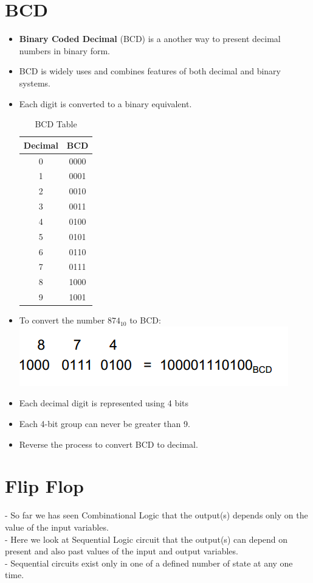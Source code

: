 \documentclass[12pt]{article}
\begin{document}
\section{BCD}
\begin{itemize}
	\item \textbf{Binary Coded Decimal} (BCD) is a another way to present decimal numbers in binary form.
 	\item BCD is widely uses and combines features of both decimal and binary systems.
 	\item Each digit is converted to a binary equivalent.
\begin{table}[h!]
\begin{center}
	\caption{BCD Table}
	\begin{tabular}{|c|c|}
	\hline
	\textbf{Decimal} & \textbf{BCD} \\
	\hline
	0 & 0000\\
	\hline
	1 & 0001\\
	\hline
	2 & 0010\\
	\hline
	3 & 0011\\
	\hline
	4 & 0100\\
	\hline
	5 & 0101\\
	\hline
	6 & 0110\\
	\hline
	7 & 0111\\
	\hline
	8 & 1000\\
	\hline
	9 & 1001\\
	\hline
	\end{tabular}
\end{center}
\end{table}
	\item To convert the number $874_{10}$ to BCD: \\
	\includegraphics{hinh5}
	\item Each decimal digit is represented using 4 bits
	\item Each 4-bit group can never be greater than 9.
	\item Reverse the process to convert BCD to decimal.
\end{itemize}
\section{Flip Flop}
- So far we has seen Combinational Logic that the output(s) depends only on the value of the input variables. \\
- Here we look at Sequential Logic circuit that the output(s) can depend on present and also past values of the input and output variables. \\
- Sequential circuits exist only in one of a defined number of state at any one time.
\end{document}
